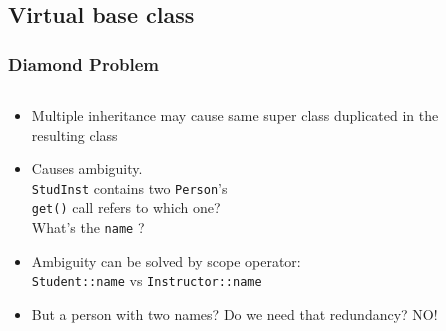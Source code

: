 \subsection{Virtual base class}
\begin{frame}
\frametitle{Diamond Problem}
\begin{columns}
\begin{column}{.55\linewidth}
\begin{itemize}[<+->]
\item Multiple inheritance may cause same super class duplicated in the resulting class
\item Causes ambiguity.\\
	\lstinline!StudInst! contains two \lstinline!Person!'s\\
	\lstinline!get()! call refers to which one?\\
	What's the \lstinline!name! ?
\item Ambiguity can be solved by scope operator:\\
	\lstinline!Student::name! vs \lstinline!Instructor::name!
\item But a person with two names? Do we need that redundancy? \alert{NO!}

\end{itemize}
\end{column}
\begin{column}{.45\linewidth}
{\scriptsize
{}
}
\end{column}
\end{columns}
\end{frame}

